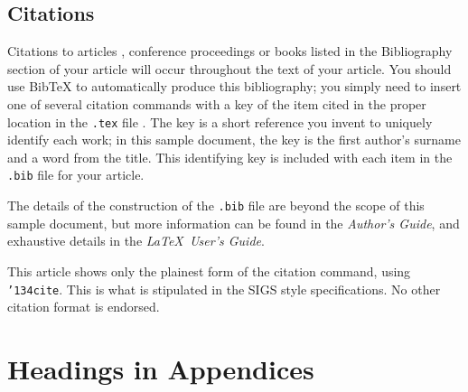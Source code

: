 \documentclass{acm_proc_article-sp}
\begin{document}
\subsection{Citations}
Citations to articles \cite{bowman:reasoning, clark:pct, braams:babel, herlihy:methodology},
conference
proceedings \cite{clark:pct} or books \cite{salas:calculus, Lamport:LaTeX} listed
in the Bibliography section of your
article will occur throughout the text of your article.
You should use BibTeX to automatically produce this bibliography;
you simply need to insert one of several citation commands with
a key of the item cited in the proper location in
the \texttt{.tex} file \cite{Lamport:LaTeX}.
The key is a short reference you invent to uniquely
identify each work; in this sample document, the key is
the first author's surname and a
word from the title.  This identifying key is included
with each item in the \texttt{.bib} file for your article.

The details of the construction of the \texttt{.bib} file
are beyond the scope of this sample document, but more
information can be found in the \textit{Author's Guide},
and exhaustive details in the \textit{\LaTeX\ User's
Guide}\cite{Lamport:LaTeX}.

This article shows only the plainest form
of the citation command, using \texttt{{\char'134}cite}.
This is what is stipulated in the SIGS style specifications.
No other citation format is endorsed.

%

%
%
\appendix
\section{Headings in Appendices}
\balancecolumns
\end{document}
